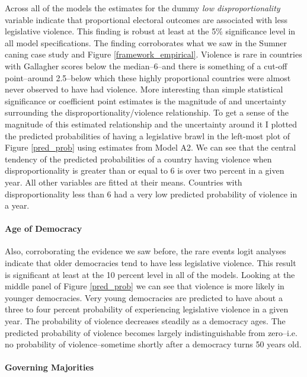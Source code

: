 \documentclass[a4paper]{article}\usepackage[]{graphicx}\usepackage[]{color}
\begin{document}
Across all of the models the estimates for the dummy {\emph{low disproportionality}} variable indicate that proportional electoral outcomes are associated with less legislative violence. This finding is robust at least at the 5\% significance level in all model specifications. The finding corroborates what we saw in the Sumner caning case study and Figure \ref{framework_empirical}. Violence is rare in countries with Gallagher scores below the median--6--and there is something of a cut-off point--around 2.5--below which these highly proportional countries were almost never observed to have had violence. More interesting than simple statistical significance or coefficient point estimates is the magnitude of and uncertainty surrounding the disproportionality/violence relationship. To get a sense of the magnitude of this estimated relationship and the uncertainty around it I plotted the predicted probabilities of having a legislative brawl in the left-most plot of Figure \ref{pred_prob} using estimates from Model A2. We can see that the central tendency of the predicted probabilities of a country having violence when disproportionality is greater than or equal to 6 is over two percent in a given year. All other variables are fitted at their means. Countries with disproportionality less than 6 had a very low predicted probability of violence in a year.

\paragraph{Age of Democracy}

Also, corroborating the evidence we saw before, the rare events logit analyses indicate that older democracies tend to have less legislative violence. This result is significant at least at the 10 percent level in all of the models. Looking at the middle panel of Figure \ref{pred_prob} we can see that violence is more likely in younger democracies. Very young democracies are predicted to have about a three to four percent probability of experiencing legislative violence in a given year. The probability of violence decreases steadily as a democracy ages. The predicted probability of violence becomes largely indistinguishable from zero--i.e. no probability of violence--sometime shortly after a democracy turns 50 years old.

\paragraph{Governing Majorities}
\end{document}
